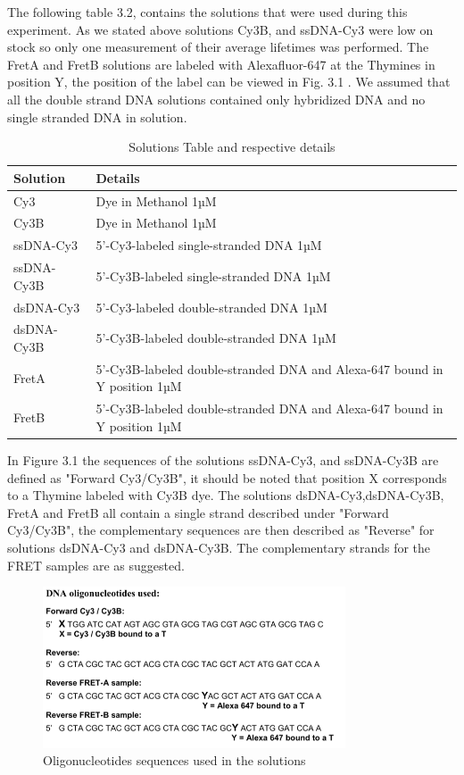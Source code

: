 \documentclass[a4paper,english,12pt,bibliography=totoc]{scrreprt}
\begin{document}
The following table 3.2, contains the solutions that were used during this experiment.
As we stated above solutions Cy3B, and ssDNA-Cy3 were low on stock so only one measurement of their average lifetimes was performed.
The FretA and FretB solutions are labeled with Alexafluor-647 at the Thymines in position Y, the position of the label can be viewed in Fig. 3.1 .
We assumed that all the double strand DNA solutions contained only hybridized DNA and no single stranded DNA in solution.


\begin{table}[htbp]
    \centering
    \begin{tabular}{|>{\raggedright}p{4cm}|p{8cm}|}
        \hline
        \textbf{Solution} & \textbf{Details} \\
        \hline
        Cy3 & Dye in Methanol 1µM\\
        \hline
        Cy3B & Dye in Methanol 1µM\\
        \hline
        ssDNA-Cy3 & 5'-Cy3-labeled single-stranded DNA 1µM \\
        \hline
        ssDNA-Cy3B & 5'-Cy3B-labeled single-stranded DNA 1µM\\
        \hline
        dsDNA-Cy3 &  5'-Cy3-labeled double-stranded DNA 1µM\\
        \hline
        dsDNA-Cy3B & 5'-Cy3B-labeled double-stranded DNA 1µM\\
        \hline
        FretA & 5'-Cy3B-labeled double-stranded DNA and Alexa-647 bound in Y position 1µM\\ 
        \hline
        FretB & 5'-Cy3B-labeled double-stranded DNA and Alexa-647 bound in Y position 1µM\\
        \hline
    \end{tabular}
    \caption{Solutions Table and respective details}
    \label{tab:solutions}
\end{table}

In Figure 3.1 the sequences of the solutions ssDNA-Cy3, and ssDNA-Cy3B are defined as "Forward Cy3/Cy3B", it should be noted that position X corresponds to a Thymine labeled with Cy3B dye.
The solutions dsDNA-Cy3,dsDNA-Cy3B, FretA and FretB all contain a single strand described under "Forward Cy3/Cy3B", the complementary sequences are then described as "Reverse" for solutions dsDNA-Cy3 and dsDNA-Cy3B.
The complementary strands for the FRET samples are as suggested.

\begin{figure}[H]
        \centering
        \includegraphics[width=0.8\textwidth]{images/other/DNAoligonucleotides_used.png}
	    \caption{Oligonucleotides sequences used in the solutions}
\end{figure}
\end{document}
